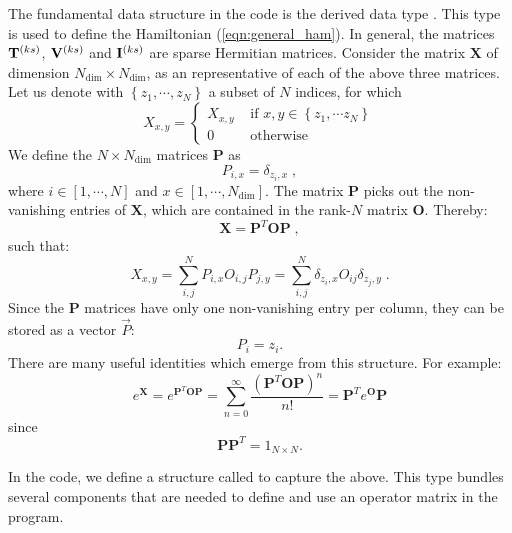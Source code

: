 The fundamental data structure in the code is the derived data type . 
This type is used to define the Hamiltonian (\ref{eqn:general_ham}).
In general, the matrices ${\bf T}^{(ks)}$, ${\bf V}^{(ks)}$ and ${\bf I}^{(ks)}$ are sparse Hermitian matrices.
Consider the  matrix   ${\bm X}$ of dimension  $N_{\mathrm{dim}} \times N_{\mathrm{dim}}$, as an representative of each of the above three matrices.  Let us  denote  with  $ \left\{z_{1},\cdots,  z_{N}  \right\}$  a subset  of $N$ indices,  
for which
\begin{equation}
X_{x,y}  =
\left\{\begin{matrix}  X_{x,y}  &  \text{ if }   x,  y  \in \left\{ z_1, \cdots z_N \right\}\\ 
                                  0         &  \text{ otherwise } 
      \end{matrix}\right.
\end{equation}
 We define the $N \times N_{\mathrm{dim}}$ matrices $\mathbf{P}$  as
\begin{equation}
P_{i,x}=\delta_{z_{i},x}\;,
\end{equation}
where $i \in [1,\cdots, N ]$ and $ x  \in [1,\cdots, N_{\mathrm{dim}}]$. The matrix  $\bm{P}$ picks out the non-vanishing entries of $\bm{X}$, 
which are contained in the rank-$N$  matrix $\bm{O}$.  Thereby: 
\begin{equation}\label{eqn:xeqpdop}
\bm{X} =\bm{P}^{T} \bm{O} \bm{P}\;,
\end{equation}
such that:
\begin{equation}
X_{x,y} = \sum\limits_{i,j}^{N}  P_{i,x}  O_{i,j} P_{j,y}=\sum\limits_{i,j}^{N} \delta_{z_{i},x}  O_{ij} \delta_{z_{j},y} \;.
\end{equation}
Since  the  $\bm{P}$ matrices have only one non-vanishing entry per column,  they can be stored as a vector $\vec{P}$:
\begin{equation}
     P_i = z_i.
\end{equation}  
There are  many useful  identities which emerge from this  structure. For example: 
\begin{equation}
	e^{\bm{X}} =  e^{\bm{P}^{T} \bm{O} \bm{P}}   = \sum_{n=0}^{\infty}  \frac{\left( \bm{P}^{T} \bm{O} \bm{P} \right)^n}{n!} =  \bm{P}^{T} e^{ \bm{O} } \bm{P}
\end{equation}
since 
\begin{equation} 
	 \bm{P} \bm{P}^{T}= 1_{N\times N}.
\end{equation}

In the code, we define a structure called  to capture the above. 
This type  bundles several components that are needed to define and use an operator matrix in the program.  

